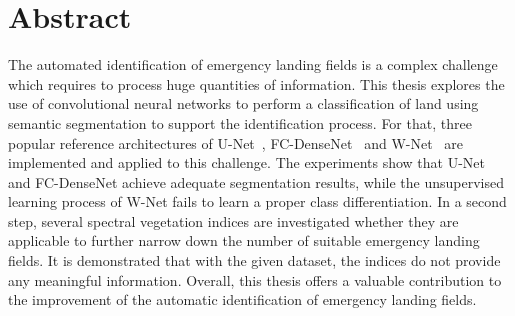 \section*{Abstract}
\noindent
The automated identification of emergency landing fields is a complex challenge which requires to process huge quantities of information. This thesis explores the use of convolutional neural networks to perform a classification of land using semantic segmentation to support the identification process. For that, three popular reference architectures of U-Net~\cite{unet15}, FC-DenseNet~\cite{denseseg17} and W-Net~\cite{wnet17} are implemented and applied to this challenge. The experiments show that U-Net and FC-DenseNet achieve adequate segmentation results, while the unsupervised learning process of W-Net fails to learn a proper class differentiation. In a second step, several spectral vegetation indices are investigated whether they are applicable to further narrow down the number of suitable emergency landing fields. It is demonstrated that with the given dataset, the indices do not provide any meaningful information. Overall, this thesis offers a valuable contribution to the improvement of the automatic identification of emergency landing fields.